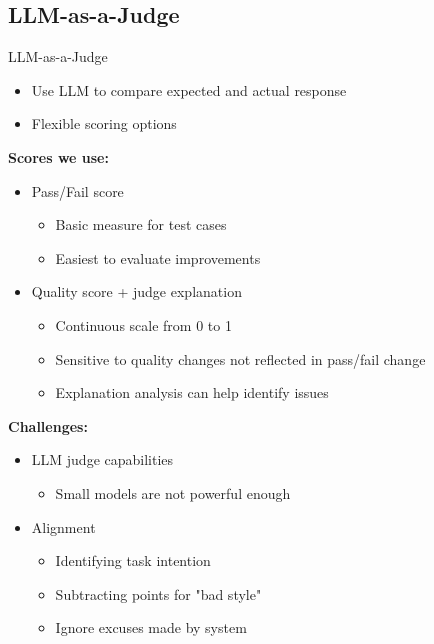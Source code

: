 \documentclass{sdqbeamer}[smallfoot]
\begin{document}
\subsection{LLM-as-a-Judge}
\begin{frame}{LLM-as-a-Judge}
    \vspace{-1.5cm}
    \begin{itemize}
        \item Use LLM to compare expected and actual response
        \item Flexible scoring options
    \end{itemize}
    \vspace{0.5cm}
    \textbf{Scores we use:}
    \begin{itemize}
        \item Pass/Fail score
            \begin{itemize}
                \item Basic measure for test cases
                \item Easiest to evaluate improvements
            \end{itemize}
        \item Quality score + judge explanation
            \begin{itemize}
                \item Continuous scale from 0 to 1
                \item Sensitive to quality changes not reflected in pass/fail change
                \item Explanation analysis can help identify issues
            \end{itemize}
    \end{itemize}
    \vspace{0.5cm}
    \textbf{Challenges:}
    \begin{itemize}
        \item LLM judge capabilities
            \begin{itemize}
                \item Small models are not powerful enough
            \end{itemize}
        \item Alignment
            \begin{itemize}
                \item Identifying task intention
                \item Subtracting points for "bad style"
                \item Ignore excuses made by system
            \end{itemize}
    \end{itemize}
\end{frame}
\end{document}
